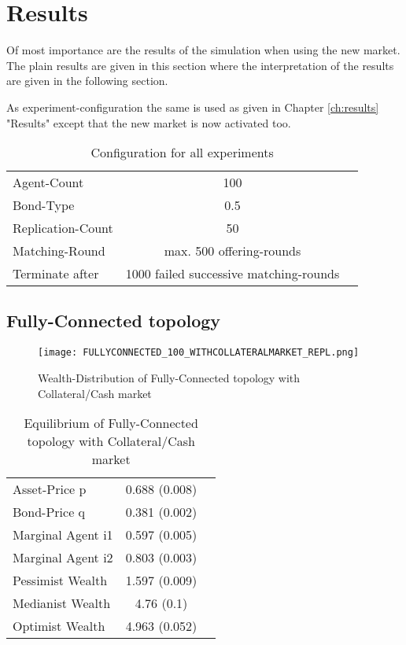 \documentclass[Bachelorarbeit.tex]{subfiles}
\begin{document}
\section{Results}
Of most importance are the results of the simulation when using the new market. The plain results are given in this section where the interpretation of the results are given in the following section.

\medskip

As experiment-configuration the same is used as given in Chapter \ref{ch:results} "Results" except that the new market is now activated too.

\begin{table}[H]
	\centering
	\caption{Configuration for all experiments}
	\begin{tabular} { l c r }
		\hline
		Agent-Count & 100 \\
		Bond-Type & 0.5 \\
		Replication-Count & 50 \\
		Matching-Round & max. 500 offering-rounds \\
		Terminate after & 1000 failed successive matching-rounds \\
		\hline
	\end{tabular}
\end{table}

\subsection{Fully-Connected topology}

\begin{figure}[H]
	\centering
  \texttt{[image: FULLYCONNECTED\_100\_WITHCOLLATERALMARKET\_REPL.png]}
	\caption{Wealth-Distribution of Fully-Connected topology with Collateral/Cash market}
	\label{fig:wealth_FULLYCONNECTED_100_WITHCOLLATERALMARKET_REPL}
\end{figure}

\begin{table}[H]
	\caption{Equilibrium of Fully-Connected topology with Collateral/Cash market}
	\centering
	\begin{tabular} { l c r }
		\hline
		Asset-Price p & 0.688 (0.008) \\
		Bond-Price q & 0.381 (0.002) \\
		Marginal Agent i1 & 0.597 (0.005) \\
		Marginal Agent i2 & 0.803 (0.003) \\
		\hline
		Pessimist Wealth & 1.597 (0.009) \\
		Medianist Wealth & 4.76 (0.1) \\
		Optimist Wealth & 4.963 (0.052) \\
		\hline
	\end{tabular}
\end{table} 
\end{document}
